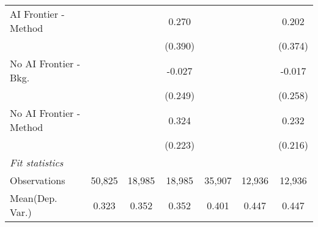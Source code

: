 \begin{tabular}{lcccccc}
   AI Frontier - Method    &               &               & 0.270         &               &               & 0.202\\   
                           &               &               & (0.390)       &               &               & (0.374)\\   
   No AI Frontier - Bkg.   &               &               & -0.027        &               &               & -0.017\\   
                           &               &               & (0.249)       &               &               & (0.258)\\   
   No AI Frontier - Method &               &               & 0.324         &               &               & 0.232\\   
                           &               &               & (0.223)       &               &               & (0.216)\\   
   \midrule
   \emph{Fit statistics}\\
   Observations            & 50,825        & 18,985        & 18,985        & 35,907        & 12,936        & 12,936\\  
Mean(Dep. Var.) & 0.323 & 0.352 & 0.352 & 0.401 & 0.447 & 0.447 \\
   

\end{tabular}
